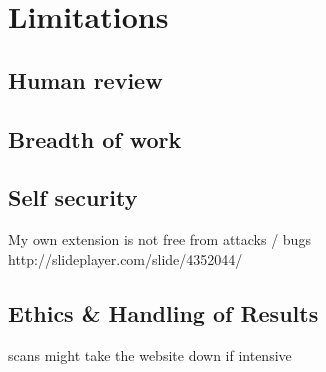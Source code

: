 
 
 
 

 
\section{Limitations}

\subsection{Human review}

 \subsection{Breadth of  work}
 
 \subsection{Self security}
 	 My own extension is not free from attacks / bugs
http://slideplayer.com/slide/4352044/

\subsection{Ethics \& Handling of Results}

scans might take the website down if intensive
 
